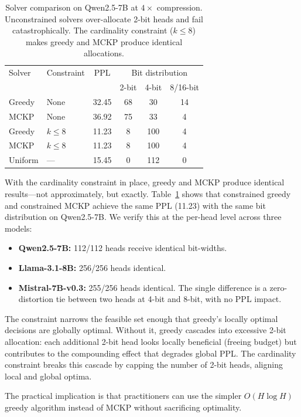 \begin{table}[t]
\centering
\small
\caption{Solver comparison on Qwen2.5-7B at $4\times$ compression. Unconstrained solvers over-allocate 2-bit heads and fail catastrophically. The cardinality constraint ($k{\leq}8$) makes greedy and MCKP produce identical allocations.\footnotemark}
\label{tab:solver_equiv}
\begin{tabular}{llcccc}
\toprule
Solver & Constraint & PPL & \multicolumn{3}{c}{Bit distribution} \\
 & & & 2-bit & 4-bit & 8/16-bit \\
\midrule
Greedy & None & 32.45 & 68 & 30 & 14 \\
MCKP & None & 36.92 & 75 & 33 & 4 \\
Greedy & $k{\leq}8$ & 11.23 & 8 & 100 & 4 \\
MCKP & $k{\leq}8$ & 11.23 & 8 & 100 & 4 \\
Uniform & --- & 15.45 & 0 & 112 & 0 \\
\bottomrule
\end{tabular}
\end{table}

With the cardinality constraint in place, greedy and MCKP produce identical results---not approximately, but exactly.
Table~\ref{tab:solver_equiv} shows that constrained greedy and constrained MCKP achieve the same PPL (11.23) with the same bit distribution on Qwen2.5-7B.
We verify this at the per-head level across three models:

\begin{itemize}[nosep]
\item \textbf{Qwen2.5-7B:} 112/112 heads receive identical bit-widths.
\item \textbf{Llama-3.1-8B:} 256/256 heads identical.
\item \textbf{Mistral-7B-v0.3:} 255/256 heads identical. The single difference is a zero-distortion tie between two heads at 4-bit and 8-bit, with no PPL impact.
\end{itemize}

The constraint narrows the feasible set enough that greedy's locally optimal decisions are globally optimal.
Without it, greedy cascades into excessive 2-bit allocation: each additional 2-bit head looks locally beneficial (freeing budget) but contributes to the compounding effect that degrades global PPL.
The cardinality constraint breaks this cascade by capping the number of 2-bit heads, aligning local and global optima.

The practical implication is that practitioners can use the simpler $O(H \log H)$ greedy algorithm instead of MCKP without sacrificing optimality.
